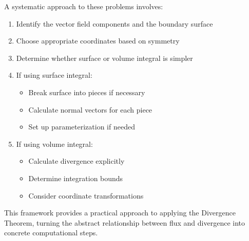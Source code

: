 \noindent A systematic approach to these problems involves:

\begin{enumerate}
    \item Identify the vector field components and the boundary surface
    \item Choose appropriate coordinates based on symmetry
    \item Determine whether surface or volume integral is simpler
    \item If using surface integral:
        \begin{itemize}
            \item Break surface into pieces if necessary
            \item Calculate normal vectors for each piece
            \item Set up parameterization if needed
        \end{itemize}
    \item If using volume integral:
        \begin{itemize}
            \item Calculate divergence explicitly
            \item Determine integration bounds
            \item Consider coordinate transformations
        \end{itemize}
\end{enumerate}

\noindent This framework provides a practical approach to applying the Divergence Theorem, turning the abstract relationship between flux and divergence into concrete computational steps.


